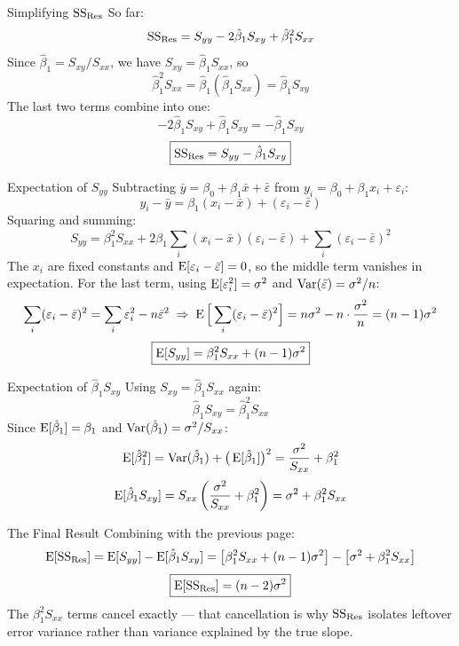 \begin{frame}{Simplifying $\mathrm{SS}_{\mathrm{Res}}$}
	So far:
	\[
		\mathrm{SS}_{\mathrm{Res}} = S_{yy} - 2\hat\beta_1 S_{xy} + \hat\beta_1^2 S_{xx}
	\]
	\pause
	Since $\hat\beta_1 = S_{xy}/S_{xx}$, we have $S_{xy} = \hat\beta_1 S_{xx}$, so
	\[
		\hat\beta_1^2 S_{xx} = \hat\beta_1(\hat\beta_1 S_{xx}) = \hat\beta_1 S_{xy}
	\]
	\pause
	The last two terms combine into one:
	\[
		-2\hat\beta_1 S_{xy} + \hat\beta_1 S_{xy} = -\hat\beta_1 S_{xy}
	\]
	\pause
	\[
		\boxed{\mathrm{SS}_{\mathrm{Res}} = S_{yy} - \hat\beta_1 S_{xy}}
	\]
\end{frame}
 

\begin{frame}{Expectation of $S_{yy}$}
	Subtracting $\bar y = \beta_0 + \beta_1\bar x + \bar\varepsilon$ from $y_i = \beta_0+\beta_1 x_i+\varepsilon_i$:
	\[
		y_i - \bar y = \beta_1(x_i-\bar x) + (\varepsilon_i - \bar\varepsilon)
	\]
	\pause
	Squaring and summing:
	\[
		S_{yy} = \beta_1^2 S_{xx} + 2\beta_1\sum_i(x_i-\bar x)(\varepsilon_i-\bar\varepsilon) + \sum_i(\varepsilon_i-\bar\varepsilon)^2
	\]
	\pause
	The $x_i$ are fixed constants and $\operatorname{E}[\varepsilon_i-\bar\varepsilon]=0$, so the middle term vanishes in expectation. For the last term, using $\operatorname{E}[\varepsilon_i^2]=\sigma^2$ and $\operatorname{Var}(\bar\varepsilon)=\sigma^2/n$:
	\[
		\sum_i(\varepsilon_i-\bar\varepsilon)^2 = \sum_i\varepsilon_i^2 - n\bar\varepsilon^2
		\;\Rightarrow\;
		\operatorname{E}\Big[\sum_i(\varepsilon_i-\bar\varepsilon)^2\Big] = n\sigma^2 - n\cdot\frac{\sigma^2}{n} = (n-1)\sigma^2
	\]
	\pause
	\[
		\boxed{\operatorname{E}[S_{yy}] = \beta_1^2 S_{xx} + (n-1)\sigma^2}
	\]
\end{frame}
 

\begin{frame}{Expectation of $\hat\beta_1 S_{xy}$}
	Using $S_{xy} = \hat\beta_1 S_{xx}$ again:
	\[
		\hat\beta_1 S_{xy} = \hat\beta_1^2 S_{xx}
	\]
	\pause
	Since $\operatorname{E}[\hat\beta_1] = \beta_1$ and $\operatorname{Var}(\hat\beta_1) = \sigma^2/S_{xx}$:
	\[
		\operatorname{E}[\hat\beta_1^2] = \operatorname{Var}(\hat\beta_1) + \big(\operatorname{E}[\hat\beta_1]\big)^2 = \frac{\sigma^2}{S_{xx}} + \beta_1^2
	\]
	\pause
	\[
		\operatorname{E}[\hat\beta_1 S_{xy}] = S_{xx}\left(\frac{\sigma^2}{S_{xx}} + \beta_1^2\right) = \sigma^2 + \beta_1^2 S_{xx}
	\]
\end{frame}


\begin{frame}{The Final Result}
	Combining with the previous page:
	\[
		\operatorname{E}[\mathrm{SS}_{\mathrm{Res}}] = \operatorname{E}[S_{yy}] - \operatorname{E}[\hat\beta_1 S_{xy}] = \big[\beta_1^2 S_{xx} + (n-1)\sigma^2\big] - \big[\sigma^2 + \beta_1^2 S_{xx}\big]
	\]
	\[
		\boxed{\operatorname{E}[\mathrm{SS}_{\mathrm{Res}}] = (n-2)\sigma^2}
	\]
	The $\beta_1^2 S_{xx}$ terms cancel exactly --- that cancellation is why $\mathrm{SS}_{\mathrm{Res}}$ isolates leftover error variance rather than variance explained by the true slope.
\end{frame}
